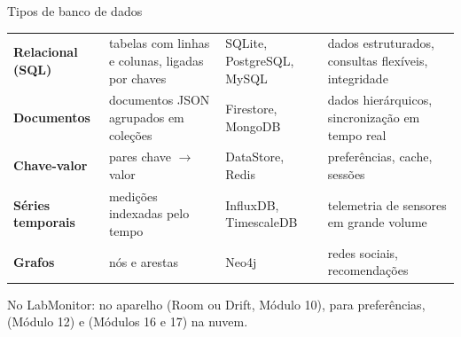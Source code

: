 \documentclass[aspectratio=169,10pt]{beamer}
\begin{document}
\begin{frame}{Tipos de banco de dados}
  \footnotesize
  \begin{tabularx}{\textwidth}{@{}l L L L@{}}
    \toprule
     &  &  &  \\
    \midrule
    \textbf{Relacional (SQL)} & tabelas com linhas e colunas, ligadas por chaves & SQLite, PostgreSQL, MySQL & dados estruturados, consultas flexíveis, integridade \\
    \textbf{Documentos} & documentos JSON agrupados em coleções & Firestore, MongoDB & dados hierárquicos, sincronização em tempo real \\
    \textbf{Chave-valor} & pares chave $\rightarrow$ valor & DataStore, Redis & preferências, cache, sessões \\
    \textbf{Séries temporais} & medições indexadas pelo tempo & InfluxDB, TimescaleDB & telemetria de sensores em grande volume \\
    \textbf{Grafos} & nós e arestas & Neo4j & redes sociais, recomendações \\
    \bottomrule
  \end{tabularx}
  \vspace{4pt}
  \begin{caixadestaque}
    No LabMonitor:  no aparelho (Room ou Drift, Módulo 10),  para preferências,  (Módulo 12) e  (Módulos 16 e 17) na nuvem.
  \end{caixadestaque}
\end{frame}
\end{document}
